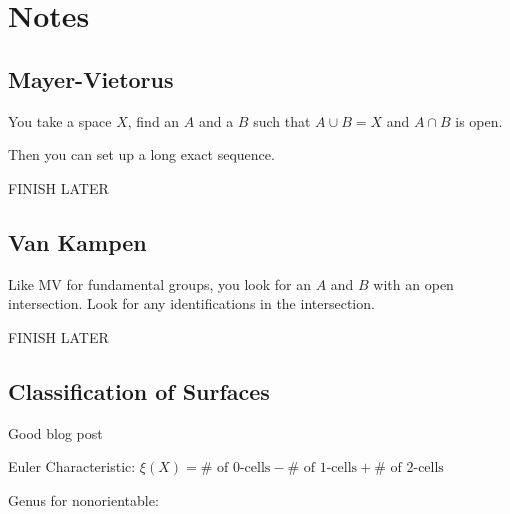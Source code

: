 \documentclass[12pt]{article}
\begin{document}
\newpage

\section*{Notes}

\subsection*{Mayer-Vietorus}

You take a space $X$, find an $A$ and a $B$ such that $A \cup B = X$ and $A \cap B$ is open.

Then you can set up a long exact sequence. 

FINISH LATER

\subsection*{Van Kampen}

Like MV for fundamental groups, you look for an $A$ and $B$ with an open intersection. Look for 
any identifications in the intersection.

FINISH LATER

\subsection*{Classification of Surfaces}

Good blog post

Euler Characteristic: $\xi(X) = \text{# of 0-cells} - \text{# of 1-cells} + \text{# of 2-cells}$

Genus for nonorientable: 
\end{document}
